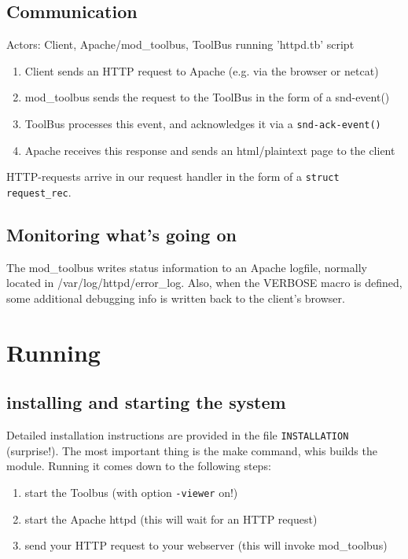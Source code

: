 \documentclass[a4paper,10pt]{article}
\begin{document}
\subsection{Communication}
Actors: Client, Apache/mod\_toolbus, ToolBus running 'httpd.tb' script
\begin{enumerate}
\item Client sends an HTTP request to Apache (e.g. via the browser or netcat)
\item mod\_toolbus sends the request to the ToolBus in the form of a snd-event()
\item ToolBus processes this event, and acknowledges it via a \texttt{snd-ack-event()}
\item Apache receives this response and sends an html/plaintext page to the client
\end{enumerate} 

HTTP-requests arrive in our request handler in the form of a \texttt{struct request\_rec}.

\subsection{Monitoring what's going on}
The mod\_toolbus writes status information to an Apache logfile, normally located in /var/log/httpd/error\_log. Also, when the VERBOSE macro is defined, some additional debugging info is written back to the client's browser.

\section{Running}
\subsection{installing and starting the system}
Detailed installation instructions are provided in the file \texttt{INSTALLATION} (surprise!). The most important thing is the make command, whis builds the module. Running it comes down to the following steps:

\begin{enumerate}
\item start the Toolbus (with option \texttt{-viewer} on!)
\item start the Apache httpd (this will wait for an HTTP request)
\item send your HTTP request to your webserver (this will invoke mod\_toolbus)
\end{enumerate}
\end{document}
